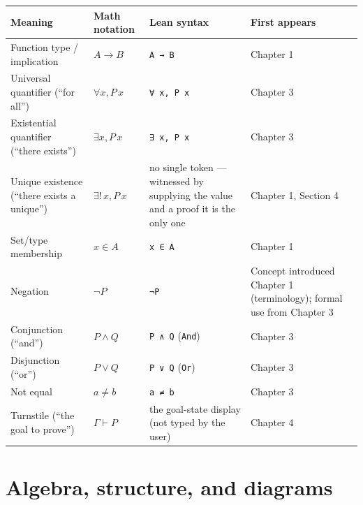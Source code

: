 \begin{longtable}[]{@{}
  >{\raggedright\arraybackslash}p{}
  >{\raggedright\arraybackslash}p{}
  >{\raggedright\arraybackslash}p{}
  >{\raggedright\arraybackslash}p{}@{}}
\toprule\noalign{}
\begin{minipage}[b]{\linewidth}\raggedright
Meaning
\end{minipage} & \begin{minipage}[b]{\linewidth}\raggedright
Math notation
\end{minipage} & \begin{minipage}[b]{\linewidth}\raggedright
Lean syntax
\end{minipage} & \begin{minipage}[b]{\linewidth}\raggedright
First appears
\end{minipage} \\
\midrule\noalign{}
\endhead
\bottomrule\noalign{}
\endlastfoot
Function type / implication & \(A \to B\) & \texttt{A → B} & Chapter 1 \\
Universal quantifier (``for all'') & \(\forall x, P\, x\) & \texttt{∀ x, P x} & Chapter 3 \\
Existential quantifier (``there exists'') & \(\exists x, P\, x\) & \texttt{∃ x, P x} & Chapter 3 \\
Unique existence (``there exists a unique'') & \(\exists!\, x, P\, x\) & no single token --- witnessed by supplying the value and a proof it is the only one & Chapter 1, Section 4 \\
Set/type membership & \(x \in A\) & \texttt{x ∈ A} & Chapter 1 \\
Negation & \(\neg P\) & \texttt{¬P} & Concept introduced Chapter 1 (terminology); formal use from Chapter 3 \\
Conjunction (``and'') & \(P \wedge Q\) & \texttt{P ∧ Q} (\texttt{And}) & Chapter 3 \\
Disjunction (``or'') & \(P \vee Q\) & \texttt{P ∨ Q} (\texttt{Or}) & Chapter 3 \\
Not equal & \(a \neq b\) & \texttt{a ≠ b} & Chapter 3 \\
Turnstile (``the goal to prove'') & \(\Gamma \vdash P\) & the goal-state display (not typed by the user) & Chapter 4 \\
\end{longtable}

\section*{Algebra, structure, and diagrams}
\label{sec:root:notation-reference:3}

